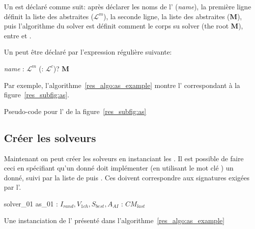 Un \as{} est déclaré comme suit: après déclarer les noms de l'\mbox{\tet{\bf \as}} ({\it name}), la première ligne définit la liste des \oms{} abstraites ($\mathcal{L}^m$), la seconde ligne, la liste des \opchs{} abstraites ($\mathbf{M}$), puis l'algorithme du solver est définit comment le corps su solver (the root \cm{} $\mathbf{M}$), entre \mbox{} et \mbox{}.

Un \as{} peut être déclaré par l'expression régulière suivante:

\begin{center}
 {\it name} : $\mathcal{L}^m$ (: $\mathcal{L}^c$)?  $\mathbf{M}$ 
\end{center}

Par exemple, l'algorithme~\ref{res_algo:as_example} montre l'\as{} correspondant à la figure~\ref{res_subfig:as}.

\begin{algorithm}[h]
\dontprintsemicolon
\scriptsize
\SetInd{2pt}{3pt}
\SetNoline
{}
\caption{Pseudo-code \posl{} pour l'\as{} de la figure~\ref{res_subfig:as}}\label{res_algo:as_example}
\end{algorithm}

\subsection{Créer les solveurs}

Maintenant on peut créer les solveurs en instanciant les \ms. Il est possible de faire ceci en spécifiant qu'un \mbox{} donné doit implémenter (en utilisant le mot clé \mbox{}) un \as{} donné, suivi par la liste de \omprefix{} puis \opchs{}. Ces \ms{} doivent correspondre aux signatures exigées par l'\as.

\begin{algorithm}[h]
\dontprintsemicolon
\scriptsize
\SetNoline
{}
 solver\_01  as\_01\;
 : $I_{rand}, V_{1ch}, S_{best}, A_{AI}$ \; 
: $CM_{last}$\;
\caption{Une instanciation de l'\as{} présenté dans l'algorithme~\ref{res_algo:as_example}}\label{res_algo:solver_def}
\end{algorithm}

